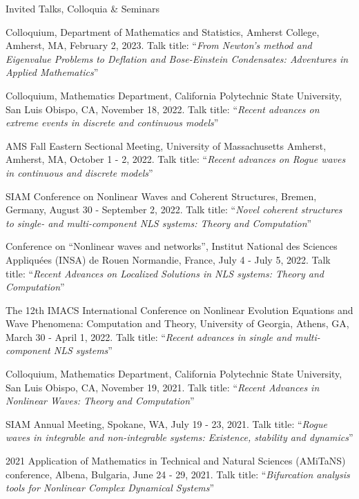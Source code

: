 \documentclass[10pt]{article} %
\begin{document}
\begin{section}{Invited Talks, Colloquia \& Seminars}
\begin{etaremune}
\item Colloquium, Department of Mathematics and Statistics, Amherst College, Amherst, MA, February 2, 2023.
Talk title: ``\textit{From Newton's method and Eigenvalue Problems to Deflation and Bose-Einstein
Condensates: Adventures in Applied Mathematics}''

\item Colloquium, Mathematics Department, California Polytechnic State University, San Luis Obispo, CA, November 18, 2022.
Talk title: ``\textit{Recent advances on extreme events in discrete and continuous models}''

\item AMS Fall Eastern Sectional Meeting, University of Massachusetts Amherst, Amherst, MA, October 1 - 2, 2022.
Talk title: ``\textit{Recent advances on Rogue waves in continuous and discrete models}''

\item SIAM Conference on Nonlinear Waves and Coherent Structures, Bremen, Germany, August 30 - September 2, 2022.
Talk title: ``\textit{Novel coherent structures to single- and multi-component NLS systems: Theory and Computation}''

\item Conference on ``Nonlinear waves and networks'', Institut National des Sciences Appliqu\'ees %
(INSA) de Rouen Normandie, France, July 4 - July 5, 2022. %
Talk title: ``\textit{Recent Advances on Localized Solutions in NLS systems: Theory and Computation}''

\item The 12th IMACS International Conference on Nonlinear Evolution Equations and Wave Phenomena: Computation and Theory, %
        University of Georgia, Athens, GA, March 30 - April 1, 2022.
        Talk title: ``\textit{Recent advances in single and multi-component NLS systems}''

\item Colloquium, Mathematics Department, California Polytechnic State University, San Luis Obispo, CA, November 19, 2021.
Talk title: ``\textit{Recent Advances in Nonlinear Waves: Theory and Computation}''

\item SIAM Annual Meeting, Spokane, WA, July 19 - 23, 2021. Talk title:
``\textit{Rogue waves in integrable and non-integrable systems: Existence, stability and dynamics}''

\item 2021 Application of Mathematics in Technical and Natural Sciences (AMiTaNS) conference, Albena, Bulgaria, June 24 - 29, 2021.
Talk title: ``\textit{Bifurcation analysis tools for Nonlinear Complex Dynamical Systems}''


\end{etaremune}
\end{section}
\end{document}
